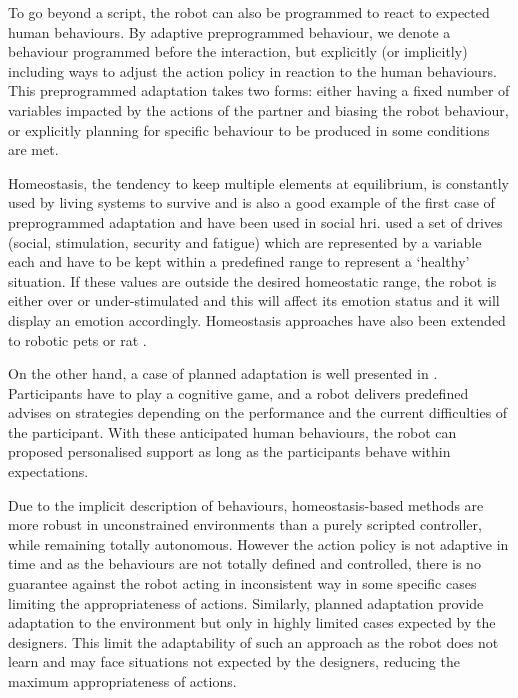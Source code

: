 	To go beyond a script, the robot can also be programmed to react to expected human behaviours. By adaptive preprogrammed behaviour, we denote a behaviour programmed before the interaction, but explicitly (or implicitly) including ways to adjust the action policy in reaction to the human behaviours. This preprogrammed adaptation takes two forms: either having a fixed number of variables impacted by the actions of the partner and biasing the robot behaviour, or explicitly planning for specific behaviour to be produced in some conditions are met.
	
	
	Homeostasis, the tendency to keep multiple elements at equilibrium, is constantly used by living systems to survive and is also a good example of the first case of preprogrammed adaptation and have been used in social \gls{hri}. \citet{breazeal1998motivational} used a set of drives (social, stimulation, security and fatigue) which are represented by a variable each and have to be kept within a predefined range to represent a `healthy' situation. If these values are outside the desired homeostatic range, the robot is either over or under-stimulated and this will affect its emotion status and it will display an emotion accordingly. Homeostasis approaches have also been extended to robotic pets \citep{arkin2003ethological} or \gls{rat} \citep{cao2017collaborative}.
	
	On the other hand, a case of planned adaptation is well presented in \citet{leyzberg2014personalizing}. Participants have to play a cognitive game,  and a robot delivers predefined advises on strategies depending on the performance and the current difficulties of the participant. With these anticipated human behaviours, the robot can proposed personalised support as long as the participants behave within expectations. 

	
	Due to the implicit description of behaviours, homeostasis-based methods are more robust in unconstrained environments than a purely scripted controller, while remaining totally autonomous. However the action policy is not adaptive in time and as the behaviours are not totally defined and controlled, there is no guarantee against the robot acting in inconsistent way in some specific cases limiting the appropriateness of actions. Similarly, planned adaptation provide adaptation to the environment but only in highly limited cases expected by the designers. This limit the adaptability of such an approach as the robot does not learn and may face situations not expected by the designers, reducing the maximum appropriateness of actions.

